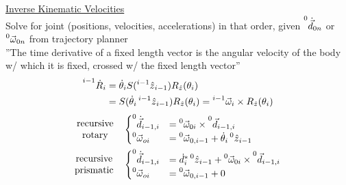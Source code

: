 \documentclass[twocolumn, 12pt]{article}    %
\begin{document}
\noindent\underline{Inverse Kinematic Velocities}\\
Solve for joint (positions, velocities, accelerations) in that order, given \(\prescript{0}{}{\dot{\vec{d}}}_{0n}\) or \(\prescript{0}{}{\vec{\omega}}_{0n}\) from trajectory planner\\
\vspace{10pt} 
''The time derivative of a fixed length vector is the angular velocity of the body w/ which it is fixed, crossed w/ the fixed length vector''
\begin{align*}
    \prescript{i-1}{}{\dot{R}}_i &= \dot{\theta}_i S(\prescript{i-1}{}{\hat{z}}_{i-1}) R_{\hat{z}}(\theta_i) \\
    &= S(\dot{\theta}_i \prescript{i-1}{}{\hat{z}}_{i-1}) R_{\hat{z}} (\theta_i) = \prescript{i-1}{}{\vec{\omega}_i} \times R_{\hat{z}}(\theta_i)
\end{align*}
\vspace{-20pt}
\begin{align*}
    \begin{matrix}
        \text{recursive} \\ \text{rotary}
    \end{matrix} \hspace{10pt}&
    \begin{cases}
        \prescript{0}{}{\dot{\vec{d}}}_{i-1, i} &= \prescript{0}{}{\vec{\omega}_{0i}} \times \prescript{0}{}{\vec{d}}_{i-1,i}\\
        \prescript{0}{}{\vec{\omega}}_{oi} &= \prescript{0}{}{\vec{\omega}}_{0,i-1} + \dot{\theta}_i \prescript{0}{}{\hat{z}}_{i-1} 
    \end{cases}\\
    \begin{matrix}
        \text{recursive} \\ \text{prismatic}
    \end{matrix}\hspace{10pt}&
    \begin{cases}
        \prescript{0}{}{\dot{\vec{d}}}_{i-1, i} &= \dot{d}_i^* \prescript{0}{}{\hat{z}}_{i-1} + \prescript{0}{}{\vec{\omega}_{0i}} \times \prescript{0}{}{\vec{d}}_{i-1,i} \\
        \prescript{0}{}{\vec{\omega}}_{oi} &= \prescript{0}{}{\vec{\omega}}_{0,i-1} + 0
    \end{cases}
\end{align*}
\vspace{-20pt} 
\end{document}
